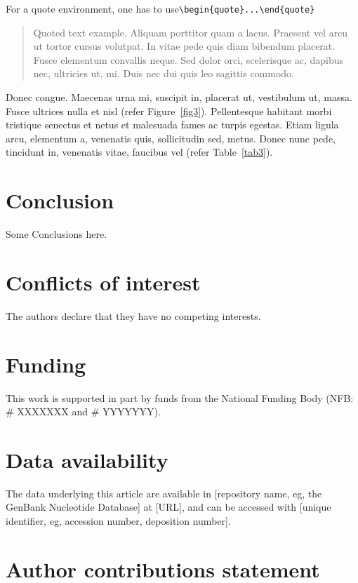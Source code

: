 \documentclass[unnumsec,webpdf,modern,large]{oup-authoring-template}
\theoremstyle{thmstyleone}%
\theoremstyle{thmstyletwo}%
\theoremstyle{thmstylethree}%
\begin{document}
\noindent
For a quote environment, one has to use\newline \verb+\begin{quote}...\end{quote}+
\begin{quote}
Quoted text example. Aliquam porttitor quam a lacus. Praesent vel arcu ut tortor cursus volutpat. In vitae pede quis diam bibendum placerat. Fusce elementum
convallis neque. Sed dolor orci, scelerisque ac, dapibus nec, ultricies ut, mi. Duis nec dui quis leo sagittis commodo.
\end{quote}
Donec congue. Maecenas urna mi, suscipit in, placerat ut, vestibulum ut, massa. Fusce ultrices nulla et nisl (refer Figure~\ref{fig3}). Pellentesque habitant morbi tristique senectus et netus et malesuada fames ac turpis egestas. Etiam ligula arcu,
elementum a, venenatis quis, sollicitudin sed, metus. Donec nunc pede, tincidunt in, venenatis vitae, faucibus vel (refer Table~\ref{tab3}).

\section{Conclusion}

Some Conclusions here.

\section{Conflicts of interest}
The authors declare that they have no competing interests.

\section{Funding}
This work is supported in part by funds from the National Funding Body (NFB: \# XXXXXXX and \# YYYYYYY).

\section{Data availability}
The data underlying this article are available in [repository name, eg, the GenBank Nucleotide Database] at [URL], and can be accessed with [unique identifier, eg, accession number, deposition number].

\section{Author contributions statement}
\end{document}
